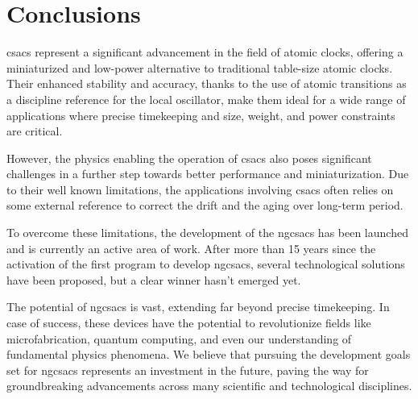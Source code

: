 \section{Conclusions}
\label{sec:conclusions}

\acrfull{csacs} represent a significant advancement in the field of atomic clocks, offering a miniaturized and low-power alternative to traditional table-size atomic clocks.
Their enhanced stability and accuracy, thanks to the use of atomic transitions as a discipline reference for the local oscillator, make them ideal for a wide range of applications where precise timekeeping and size, weight, and power constraints are critical.

However, the physics enabling the operation of \acrshort{csacs} also poses significant challenges in a further step towards better performance and miniaturization.
Due to their well known limitations, the applications involving \acrshort{csacs} often relies on some external reference to correct the drift and the aging over long-term period.

To overcome these limitations, the development of the \acrfull{ngcsacs} has been launched and is currently an active area of work.
After more than 15 years since the activation of the first program to develop \acrshort{ngcsacs}, several technological solutions have been proposed, but a clear winner hasn't emerged yet.

The potential of \acrshort{ngcsacs} is vast, extending far beyond precise timekeeping.
In case of success, these devices have the potential to revolutionize fields like microfabrication, quantum computing, and even our understanding of fundamental physics phenomena.
We believe that pursuing the development goals set for \acrshort{ngcsacs} represents an investment in the future, paving the way for groundbreaking advancements across many scientific and technological disciplines.